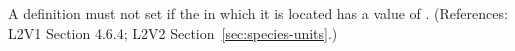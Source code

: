 A \Species definition must not set  if the
\Compartment in which it is located has a  value
of .  (References: L2V1 Section 4.6.4; L2V2
Section~\ref{sec:species-units}.)
